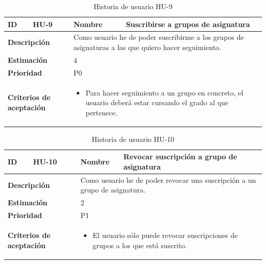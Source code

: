 \begin{table}[H]
    \centering
    \begin{tabular}{|p{2cm}|p{4cm}|p{2cm}|p{4cm}|}
        \hline
        \textbf{ID} & HU-9 & \textbf{Nombre} & Suscribirse a grupos de asignatura \\
        \hline
        \multicolumn{2}{|p{6cm}|}{\textbf{Descripción}} & \multicolumn{2}{p{6cm}|}{Como usuario he de poder suscribirme a los grupos de asignaturas a las que quiero hacer seguimiento.} \\
        \hline
        \multicolumn{2}{|p{6cm}|}{\textbf{Estimación}} & \multicolumn{2}{p{6cm}|}{4} \\
        \hline
        \multicolumn{2}{|p{6cm}|}{\textbf{Prioridad}} & \multicolumn{2}{p{6cm}|}{P0} \\
        \hline
        \multicolumn{2}{|p{6cm}|}{\textbf{Criterios de aceptación}} & \multicolumn{2}{p{6cm}|}{
            \begin{itemize}
                \item Para hacer seguimiento a un grupo en concreto, el usuario deberá estar cursando el grado al que pertenece.
            \end{itemize}
        } \\
        \hline
    \end{tabular}
    \caption{Historia de usuario HU-9}
    \label{tab:hu_9}
\end{table}

\begin{table}[H]
    \centering
    \begin{tabular}{|p{2cm}|p{4cm}|p{2cm}|p{4cm}|}
        \hline
        \textbf{ID} & HU-10 & \textbf{Nombre} & Revocar suscripción a grupo de asignatura \\
        \hline
        \multicolumn{2}{|p{6cm}|}{\textbf{Descripción}} & \multicolumn{2}{p{6cm}|}{Como usuario he de poder revocar una suscripción a un grupo de asignatura.} \\
        \hline
        \multicolumn{2}{|p{6cm}|}{\textbf{Estimación}} & \multicolumn{2}{p{6cm}|}{2} \\
        \hline
        \multicolumn{2}{|p{6cm}|}{\textbf{Prioridad}} & \multicolumn{2}{p{6cm}|}{P1} \\
        \hline
        \multicolumn{2}{|p{6cm}|}{\textbf{Criterios de aceptación}} & \multicolumn{2}{p{6cm}|}{
            \begin{itemize}
                \item El usuario sólo puede revocar suscripciones de grupos a los que está suscrito.
            \end{itemize}
        } \\
        \hline
    \end{tabular}
    \caption{Historia de usuario HU-10}
    \label{tab:hu_10}
\end{table}

